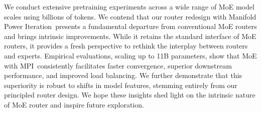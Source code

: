\documentclass[11pt]{article}
\newcommand{\name}{MPI}
\newcommand{\Name}{Manifold Power Iteration}
\begin{document}

We conduct extensive pretraining experiments across a wide range of MoE model scales using billions of tokens.
We contend that our router redesign with \Name\ presents a fundamental departure from conventional MoE routers and brings intrinsic improvements.
While it retains the standard interface of MoE routers, it provides a fresh perspective to rethink the interplay between routers and experts.
Empirical evaluations, scaling up to 11B parameters, show that MoE with \name\ consistently facilitates faster convergence, superior downstream performance, and improved load balancing. 
We further demonstrate that this superiority is robust to shifts in model features, stemming entirely from our principled router design.
We hope these insights shed light on the intrinsic nature of MoE router and inspire future exploration. 
\end{document}
